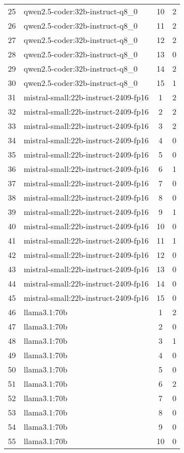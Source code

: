 \begin{longtable}{|c|p{7cm}|c|c|}
25 & qwen2.5-coder:32b-instruct-q8\_0 & 10 & 2 \\
26 & qwen2.5-coder:32b-instruct-q8\_0 & 11 & 2 \\
27 & qwen2.5-coder:32b-instruct-q8\_0 & 12 & 2 \\
28 & qwen2.5-coder:32b-instruct-q8\_0 & 13 & 0 \\
29 & qwen2.5-coder:32b-instruct-q8\_0 & 14 & 2 \\
30 & qwen2.5-coder:32b-instruct-q8\_0 & 15 & 1 \\
31 & mistral-small:22b-instruct-2409-fp16 & 1 & 2 \\
32 & mistral-small:22b-instruct-2409-fp16 & 2 & 2 \\
33 & mistral-small:22b-instruct-2409-fp16 & 3 & 2 \\
34 & mistral-small:22b-instruct-2409-fp16 & 4 & 0 \\
35 & mistral-small:22b-instruct-2409-fp16 & 5 & 0 \\
36 & mistral-small:22b-instruct-2409-fp16 & 6 & 1 \\
37 & mistral-small:22b-instruct-2409-fp16 & 7 & 0 \\
38 & mistral-small:22b-instruct-2409-fp16 & 8 & 0 \\
39 & mistral-small:22b-instruct-2409-fp16 & 9 & 1 \\
40 & mistral-small:22b-instruct-2409-fp16 & 10 & 0 \\
41 & mistral-small:22b-instruct-2409-fp16 & 11 & 1 \\
42 & mistral-small:22b-instruct-2409-fp16 & 12 & 0 \\
43 & mistral-small:22b-instruct-2409-fp16 & 13 & 0 \\
44 & mistral-small:22b-instruct-2409-fp16 & 14 & 0 \\
45 & mistral-small:22b-instruct-2409-fp16 & 15 & 0 \\
46 & llama3.1:70b & 1 & 2 \\
47 & llama3.1:70b & 2 & 0 \\
48 & llama3.1:70b & 3 & 1 \\
49 & llama3.1:70b & 4 & 0 \\
50 & llama3.1:70b & 5 & 0 \\
51 & llama3.1:70b & 6 & 2 \\
52 & llama3.1:70b & 7 & 0 \\
53 & llama3.1:70b & 8 & 0 \\
54 & llama3.1:70b & 9 & 0 \\
55 & llama3.1:70b & 10 & 0 \\

\end{longtable}
